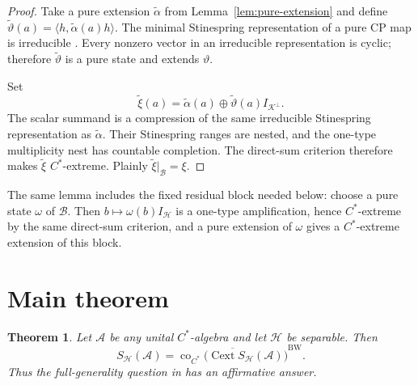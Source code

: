 \documentclass[11pt]{article}
\newtheorem{theorem}{Theorem}
\newcommand{\A}{\mathcal A}
\newcommand{\B}{\mathcal B}
\newcommand{\Hh}{\mathcal H}
\newcommand{\K}{\mathcal K}
\begin{document}
\begin{proof}
Take a pure extension $\widetilde\alpha$ from Lemma~\ref{lem:pure-extension} and
define
$\widetilde\vartheta(a)=\langle h,\widetilde\alpha(a)h\rangle$.
The minimal Stinespring representation of a pure CP map is irreducible
\cite{Arveson}. Every nonzero vector in an irreducible representation is cyclic;
therefore $\widetilde\vartheta$ is a pure state and extends $\vartheta$.

Set
\[
 \widetilde\xi(a)=\widetilde\alpha(a)
       \oplus\widetilde\vartheta(a)I_{\K^\perp}.
\]
The scalar summand is a compression of the same irreducible Stinespring
representation as $\widetilde\alpha$. Their Stinespring ranges are nested, and the
one-type multiplicity nest has countable completion. The direct-sum criterion
\cite[Theorem 3.6]{BK} therefore makes $\widetilde\xi$ $C^*$-extreme. Plainly
$\widetilde\xi|_{\B}=\xi$.
\end{proof}

The same lemma includes the fixed residual block needed below: choose a pure state
$\omega$ of $\B$. Then $b\mapsto\omega(b)I_{\Hh}$ is a one-type amplification,
hence $C^*$-extreme by the same direct-sum criterion, and a pure extension of
$\omega$ gives a $C^*$-extreme extension of this block.

\section*{Main theorem}

\begin{theorem}\label{thm:main}
Let $\A$ be any unital $C^*$-algebra and let $\Hh$ be separable. Then
\[
 \boxed{
 S_{\Hh}(\A)=
 \overline{\operatorname{co}_{C^*}
 \bigl(\operatorname{Cext}S_{\Hh}(\A)\bigr)}^{\mathrm{BW}}.}
\]
Thus the full-generality question in \cite{BK} has an affirmative answer.
\end{theorem}
\end{document}
